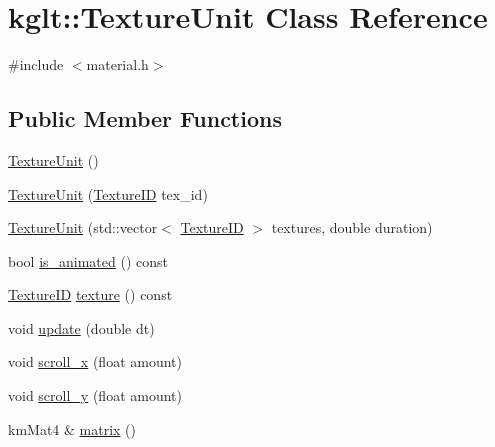 \hypertarget{classkglt_1_1_texture_unit}{\section{kglt\-:\-:Texture\-Unit Class Reference}
\label{classkglt_1_1_texture_unit}
}


{\ttfamily \#include $<$material.\-h$>$}

\subsection*{Public Member Functions}
\begin{DoxyCompactItemize}
\item 
\hyperlink{classkglt_1_1_texture_unit_ac82d8a1f395e02154987a8d1fd07c432}{Texture\-Unit} ()
\item 
\hyperlink{classkglt_1_1_texture_unit_aafdf816782fd04d480bd012170c256d2}{Texture\-Unit} (\hyperlink{namespacekglt_aaea040f25edb7f75ca0f3aa8136a45a1}{Texture\-I\-D} tex\-\_\-id)
\item 
\hyperlink{classkglt_1_1_texture_unit_ace6d50c92b0ce4964cd31def29ba6b3a}{Texture\-Unit} (std\-::vector$<$ \hyperlink{namespacekglt_aaea040f25edb7f75ca0f3aa8136a45a1}{Texture\-I\-D} $>$ textures, double duration)
\item 
bool \hyperlink{classkglt_1_1_texture_unit_a0377647e856ab49a2a57abb523a1977f}{is\-\_\-animated} () const 
\item 
\hyperlink{namespacekglt_aaea040f25edb7f75ca0f3aa8136a45a1}{Texture\-I\-D} \hyperlink{classkglt_1_1_texture_unit_aa10e5c921b77b46d0645da2a40514c74}{texture} () const 
\item 
void \hyperlink{classkglt_1_1_texture_unit_abb9b9513e2006a00182fce3edeb05486}{update} (double dt)
\item 
void \hyperlink{classkglt_1_1_texture_unit_a451e4b6ad588cbb63b62d7a8faf753b6}{scroll\-\_\-x} (float amount)
\item 
void \hyperlink{classkglt_1_1_texture_unit_adcbfa742235d00cb1aec7c428e6576b9}{scroll\-\_\-y} (float amount)
\item 
km\-Mat4 \& \hyperlink{classkglt_1_1_texture_unit_aa90d2d2d02e64b3c040f76180538dbbd}{matrix} ()
\end{DoxyCompactItemize}


